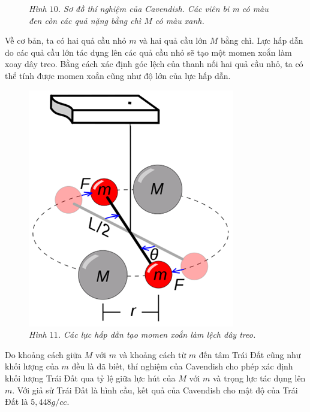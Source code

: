 \begin{multicols}{2}
\begin{figure}[H]
		\caption{\small\textit{\color{timhieukhoahoc}Hình $10$. Sơ đồ thí nghiệm của Cavendish. Các viên bi m có màu đen còn các quả nặng bằng chì $M$ có màu xanh.}}
		\vspace*{-10pt}
	\end{figure}
	Về cơ bản, ta có hai quả cầu nhỏ $m$ và hai quả cầu lớn $M$ bằng chì. Lực hấp dẫn do các quả cầu lớn tác dụng lên các quả cầu nhỏ sẽ tạo một momen xoắn làm xoay dây treo. Bằng cách xác định góc lệch của thanh nối hai quả cầu nhỏ, ta có thể tính được momen xoắn cũng như độ lớn của lực hấp dẫn.
	\begin{figure}[H]
		\vspace*{-5pt}
		\centering
		\captionsetup{labelformat= empty, justification=centering}
		\includegraphics[width =1\linewidth]{13}
		\caption{\small\textit{\color{timhieukhoahoc}Hình $11$. Các lực hấp dẫn tạo momen xoắn làm lệch dây treo.}}
		\vspace*{-10pt}
	\end{figure}
	Do khoảng cách giữa $M$ với $m$ và khoảng cách từ $m$ đến tâm Trái Đất cũng như khối lượng của $m$ đều là đã biết, thí nghiệm của Cavendish cho phép xác định khối lượng Trái Đất qua tỷ lệ giữa lực hút của $M$ với $m$ và trọng lực tác dụng lên $m$. Với giả sử Trái Đất là hình cầu, kết quả của Cavendish cho mật độ của Trái Đất là $5{,}448 g/cc$.

\end{multicols}
